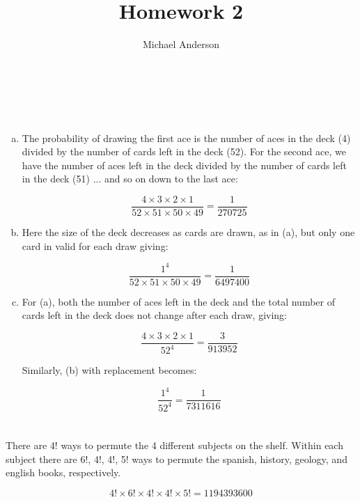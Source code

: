 \documentclass{article}
\author{Michael Anderson}
\title{Homework 2}
\begin{document}
\setlength{\parskip}{1em}
\maketitle
{}
\\
\flushleft
\newpage

\section{}
\begin{enumerate}[(a)]
\item
The probability of drawing the first ace is the number of aces in the deck (4)
divided by the number of cards left in the deck (52). For the second ace, we
have the number of aces left in the deck divided by the number of cards left in
the deck (51) ... and so on down to the last ace:

\[
\frac{4 \times 3 \times 2 \times 1}{52 \times 51 \times 50 \times 49} = 
\frac{1}{270725}
\]

\item
Here the size of the deck decreases as cards are drawn, as in (a), but only one
card in valid for each draw giving:

\[
\frac{1^4}{52 \times 51 \times 50 \times 49} = 
\frac{1}{6497400}
\]

\item
For (a), both the number of aces left in the deck and the total number of cards 
left in the deck does not change after each draw, giving:

\[
\frac{4 \times 3 \times 2 \times 1}{52^4} = 
\frac{3}{913952}
\]

Similarly, (b) with replacement becomes:

\[
\frac{1^4}{52^4} = 
\frac{1}{7311616}
\]

\end{enumerate}

\section{}
There are 4! ways to permute the 4 different subjects on the shelf.
Within each subject there are 6!, 4!, 4!, 5! ways to permute the spanish,
history, geology, and english books, respectively.

\[
4! \times 6! \times 4! \times 4! \times 5! = 1194393600 
\]
\end{document}
